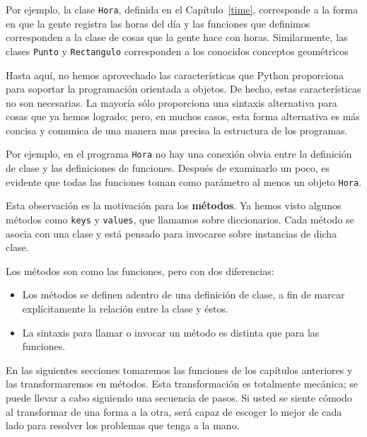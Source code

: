 Por ejemplo, la clase  \texttt{Hora}, definida en el 
 Capítulo~\ref{time}, corresponde a la forma en que la gente
registra las horas del día y las funciones que definimos
corresponden a la clase de cosas que la gente hace con
horas. Similarmente, las clases \texttt{Punto} y \texttt{Rectangulo} corresponden a los conocidos
 conceptos geométricos 

Hasta aquí, no hemos aprovechado las características que
Python proporciona para soportar la programación orientada
a objetos. De hecho, estas características no son necesarias.
La mayoría sólo proporciona una sintaxis alternativa para
cosas que ya hemos logrado; pero, en muchos casos, esta
forma alternativa es más concisa y comunica de una manera
mas precisa la estructura de los programas.

Por ejemplo, en el programa \texttt{Hora} no hay una 
conexión obvia entre la definición de clase y las
definiciones de funciones. Después de examinarlo un poco,
es evidente que todas las funciones toman como parámetro
al menos un objeto \texttt{Hora}.

Esta observación es la motivación para los  {\bf métodos}. Ya
hemos visto algunos métodos como \texttt{keys} y \texttt{values},
que llamamos sobre  diccionarios.  Cada método se asocia
con una clase y está pensado para invocarse sobre instancias
de dicha clase.


Los métodos son como las funciones, pero con dos  diferencias:

\begin{itemize}

\item Los métodos se definen adentro de una definición 
de clase, a fin de marcar explícitamente la relación 
entre la clase y éstos.

\item La sintaxis para llamar o invocar un método es distinta
que para las funciones.

\end{itemize}

En las siguientes secciones tomaremos las funciones
de los capítulos anteriores y las transformaremos en 
métodos. Esta transformación es totalmente mecánica; se puede 
llevar a cabo siguiendo una secuencia de pasos. Si usted
se siente cómodo al transformar de una forma a la otra,
será capaz de escoger lo mejor de cada lado para resolver
los problemas que tenga a la mano.


